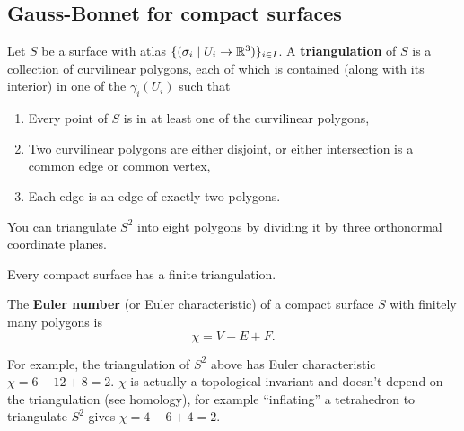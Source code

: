   \subsection{Gauss-Bonnet for compact surfaces}
  \begin{definition}[]
      Let $S$ be a surface with atlas $\{(\sigma_i \mid U_i  \to \mathbb{R}^3)\} _{i\in I}$. A \textbf{triangulation} of $S$ is a collection of curvilinear polygons, each of which is contained (along with its interior) in one of the $\gamma _i (U_i )$ such that
      \begin{enumerate}[label=(\roman*)]
      \setlength\itemsep{-.2em}
          \item Every point of $S$ is in at least one of the curvilinear polygons,
            \item Two curvilinear polygons are either disjoint, or either intersection is a common edge or common vertex,
            \item Each edge is an edge of exactly two polygons.
      \end{enumerate}
  \end{definition}
  \begin{example}
      You can triangulate $S^2$ into eight polygons by dividing it by three orthonormal coordinate planes.
  \end{example}
  \begin{theorem}
      Every compact surface has a finite triangulation.
  \end{theorem}
  \begin{definition}[]
      The \textbf{Euler number} (or Euler characteristic) of a compact surface $S$ with finitely many polygons is \[
      \chi= V-E+F.
      \]
  \end{definition}
  For example, the triangulation of $S^2$ above has Euler characteristic $\chi= 6-12+8=2$. $\chi$ is actually a topological invariant and doesn't depend on the triangulation (see homology), for example ``inflating'' a tetrahedron to triangulate $S^2$ gives $\chi=4-6+4=2$.
      
